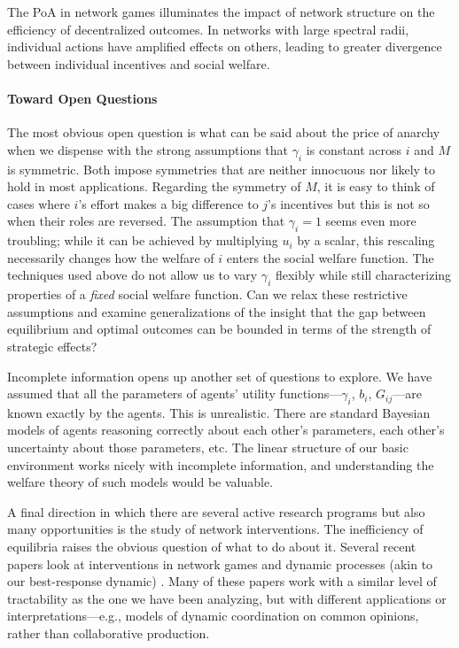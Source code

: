 \documentclass{notices}
\theoremstyle{definition}\newtheorem{problem}{Problem}
\theoremstyle{definition} \newtheorem{remark}{Remark}
\theoremstyle{definition} \newtheorem{claim}{Claim}
\theoremstyle{definition} \newtheorem{thm}{Theorem}
\theoremstyle{definition} \newtheorem*{thmNoNum}{Theorem}
\theoremstyle{definition} \newtheorem{definition}{Definition}
\theoremstyle{definition} \theoremstyle{remark}
\theoremstyle{definition} \newtheorem{note}{Note}
\theoremstyle{definition} \newtheorem{notation}{Notation}
\theoremstyle{definition} \theoremstyle{plain}
\theoremstyle{definition} \newtheorem{condition}{Condition}
\theoremstyle{definition} \newtheorem{lem}{Lemma}
\theoremstyle{definition} \newtheorem{corollary}{Corollary}
\theoremstyle{definition} \newtheorem{prop}{Proposition}
\theoremstyle{definition} \newtheorem{ax}{Axiom}
\theoremstyle{definition} \newtheorem{assumption}{Assumption}
\theoremstyle{definition} \newtheorem{example}{Example}
\theoremstyle{definition} \newtheorem{rmk}{Remark}
\theoremstyle{definition} \newtheorem{res}{Result}
\theoremstyle{definition} \newtheorem{que}{Question}
\theoremstyle{definition} \newtheorem{conjecture}{Conjecture}
\theoremstyle{definition}
\begin{document}
The PoA in network games illuminates the impact of network structure on the efficiency of decentralized outcomes. In networks with large spectral radii, individual actions have amplified effects on others, leading to greater divergence between individual incentives and social welfare. 

\paragraph{Toward Open Questions}

The most obvious open question is what can be said about the price of anarchy when we dispense with the strong assumptions that $\gamma_i$ is constant across $i$ and $M$ is symmetric. Both impose symmetries that are neither innocuous nor likely to hold in most applications. Regarding the symmetry of $M$, it is easy to think of cases where $i$'s effort makes a big difference to $j$'s incentives but this is not so when their roles are reversed. The assumption that $\gamma_i=1$ seems even more troubling; while it can be achieved by multiplying $u_i$ by a scalar, this rescaling necessarily changes how the welfare of $i$ enters the social welfare function. The techniques used above do not allow us to vary $\gamma_i$ flexibly while still characterizing properties of a \emph{fixed} social welfare function. Can we relax these restrictive assumptions and examine generalizations of the insight that the gap between equilibrium and optimal outcomes can be bounded in terms of the strength of strategic effects? 

Incomplete information opens up another set of questions to explore. We have assumed that all the parameters of agents' utility functions---$\gamma_i$, $b_i$, $G_{ij}$---are known exactly by the agents. This is unrealistic. There are standard Bayesian models of   agents reasoning correctly about each other's parameters, each other's uncertainty about those parameters, etc. The linear structure of our basic environment works nicely with incomplete information, and understanding the welfare theory of such models would be valuable.

A final direction in which there are several active research programs but also many opportunities is the study of network interventions. The inefficiency of equilibria raises the obvious question of what to do about it. Several recent papers look at interventions in network games and dynamic processes (akin to our best-response dynamic) \cite{gaitonde2020adversarial,GaleottiGolubGoyal2020,JeongShin2024}. Many of these papers work with a similar level of tractability as the one we have been analyzing, but with different applications or interpretations---e.g., models of dynamic coordination on common opinions, rather than collaborative production.
\end{document}

